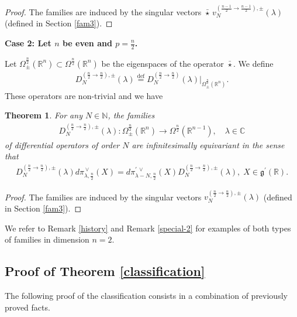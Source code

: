 \documentclass[a4paper,12pt,reqno]{amsart}
\newtheorem{theorem}{Theorem}
\numberwithin{theorem}{subsection}
\numberwithin{equation}{section}
\begin{document}
\begin{proof} The families are induced by the singular vectors
$\bar{\star} \, v_N^{(\frac{n-1}{2}\to \frac{n-1}{2}),\pm}(\lambda)$ (defined
in Section \ref{fam3}).
\end{proof}

{\bf Case 2: Let $n$ be even and $p=\frac{n}{2}$.}

Let $\Omega^{\frac n2}_\pm({\mathbb{R}}^n) \subset \Omega^{\frac n2}({\mathbb{R}}^n)$ be the
eigenspaces of the operator $\bar{\star}$. We define
\begin{align*}
   D^{(\frac{n}{2}\to \frac{n}{2}),{\pm}}_N(\lambda)
   {\stackrel{\text{def}}{=}} D^{(\frac{n}{2}\to \frac{n}{2})}_N(\lambda) |_{\Omega^{\frac{n}{2}}_\pm({\mathbb{R}}^n)}.
\end{align*}
These operators are non-trivial and we have

\begin{theorem}\label{fam-mid-even} For any $N\in{\mathbb{N}}$, the families
\begin{align*}
   D^{(\frac{n}{2}\to \frac{n}{2}),\pm}_N(\lambda):
   \Omega^{\frac{n}{2}}_\pm({\mathbb{R}}^{n})\to \Omega^{\frac{n}{2}}({\mathbb{R}}^{n-1}), \quad \lambda \in {\mathbb{C}}
\end{align*}
of differential operators of order $N$ are infinitesimally equivariant in the
sense that
\begin{align*}
   D^{(\frac{n}{2}\to \frac{n}{2}),\pm}_N(\lambda) {d}\pi^{{\,\vee}}_{\lambda,\frac{n}{2}}(X)
   = {d} \pi^{\prime{{\,\vee}}}_{\lambda-N,\frac{n}{2}}(X)  D^{(\frac{n}{2}\to
   \frac{n}{2}),\pm}_N(\lambda), \; X \in {{\mathfrak g}}^\prime({\mathbb{R}}).
\end{align*}
\end{theorem}

\begin{proof} The families are induced by the singular vectors
$v_N^{(\frac{n}{2}\to \frac{n}{2}),\pm}(\lambda)$ (defined in Section
\ref{fam3}).
\end{proof}

We refer to Remark \ref{history} and Remark \ref{special-2} for examples of
both types of families in dimension $n=2$.

\subsection{Proof of Theorem \ref{classification}}\label{proof-classify}

The following proof of the classification consists in a combination of
previously proved facts.
\end{document}
